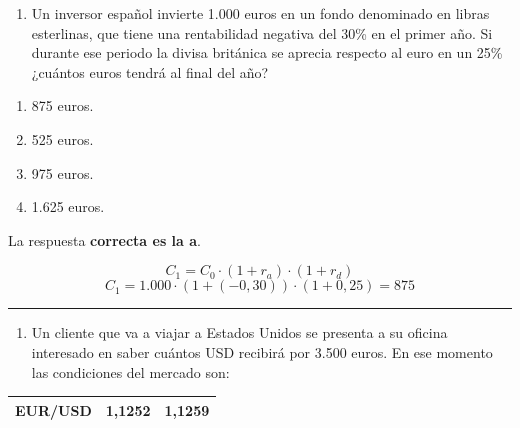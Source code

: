\documentclass[
  letterpaper,
  DIV=11,
  numbers=noendperiod]{scrreprt}
\providecommand{\tightlist}{%
  \setlength{\itemsep}{0pt}\setlength{\parskip}{0pt}}\usepackage{longtable,booktabs,array}
\begin{document}
\begin{enumerate}
\def\labelenumi{\arabic{enumi}.}
\setcounter{enumi}{47}
\tightlist
\item
  Un inversor español invierte 1.000 euros en un fondo denominado en
  libras esterlinas, que tiene una rentabilidad negativa del 30\% en el
  primer año. Si durante ese periodo la divisa británica se aprecia
  respecto al euro en un 25\% ¿cuántos euros tendrá al final del año?
\end{enumerate}

\begin{enumerate}
\def\labelenumi{\alph{enumi}.}
\item
  875 euros.
\item
  525 euros.
\item
  975 euros.
\item
  1.625 euros.
\end{enumerate}

\begin{tcolorbox}[enhanced jigsaw, left=2mm, opacityback=0, colback=white, breakable, arc=.35mm, bottomrule=.15mm, rightrule=.15mm, toprule=.15mm, leftrule=.75mm, colframe=quarto-callout-tip-color-frame]
\begin{minipage}[t]{5.5mm}
\textcolor{quarto-callout-tip-color}{\faLightbulb}
\end{minipage}%
\begin{minipage}[t]{\textwidth - 5.5mm}

La respuesta \textbf{correcta es la a}.

\[C_1=C_0\cdot (1+r_a)\cdot (1+r_d)\]
\[C_1=1.000\cdot (1+(-0,30))\cdot (1+0,25)=875\]

\end{minipage}%
\end{tcolorbox}

\begin{center}\rule{0.5\linewidth}{0.5pt}\end{center}

\begin{enumerate}
\def\labelenumi{\arabic{enumi}.}
\setcounter{enumi}{48}
\tightlist
\item
  Un cliente que va a viajar a Estados Unidos se presenta a su oficina
  interesado en saber cuántos USD recibirá por 3.500 euros. En ese
  momento las condiciones del mercado son:
\end{enumerate}

\begin{longtable}[]{@{}lll@{}}
\toprule()
\endhead
EUR/USD & 1,1252 & 1,1259 \\
\bottomrule()
\end{longtable}
\end{document}
